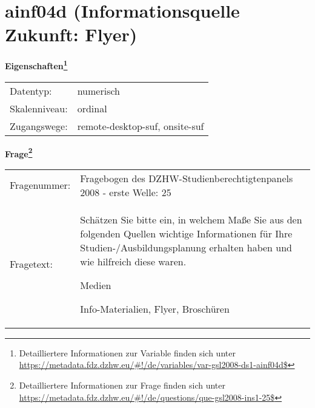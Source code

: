 
    \setcounter{footnote}{0}

    \vspace*{-1.8cm}
	\section{ainf04d (Informationsquelle Zukunft: Flyer)}
	\label{section:ainf04d}



    \vspace*{0.5cm}
    \noindent\textbf{Eigenschaften\footnote{Detailliertere Informationen zur Variable finden sich unter
		\url{https://metadata.fdz.dzhw.eu/\#!/de/variables/var-gsl2008-ds1-ainf04d$}}}\\
	\begin{tabularx}{\hsize}{@{}lX}
	Datentyp: & numerisch \\
	Skalenniveau: & ordinal \\
	Zugangswege: &
	  remote-desktop-suf, 
	  onsite-suf
 \\
    \end{tabularx}



				\vspace*{0.5cm}
                \noindent\textbf{Frage\footnote{Detailliertere Informationen zur Frage finden sich unter
		              \url{https://metadata.fdz.dzhw.eu/\#!/de/questions/que-gsl2008-ins1-25$}}}\\
				\begin{tabularx}{\hsize}{@{}lX}
					Fragenummer: &
					  Fragebogen des DZHW-Studienberechtigtenpanels 2008 - erste Welle:
					  25
 \\
					Fragetext: & Schätzen Sie bitte ein, in welchem Maße Sie aus den folgenden Quellen wichtige Informationen für Ihre Studien-/Ausbildungsplanung erhalten haben und wie hilfreich diese waren.\par  Medien\par  Info-Materialien, Flyer, Broschüren \\
				\end{tabularx}





